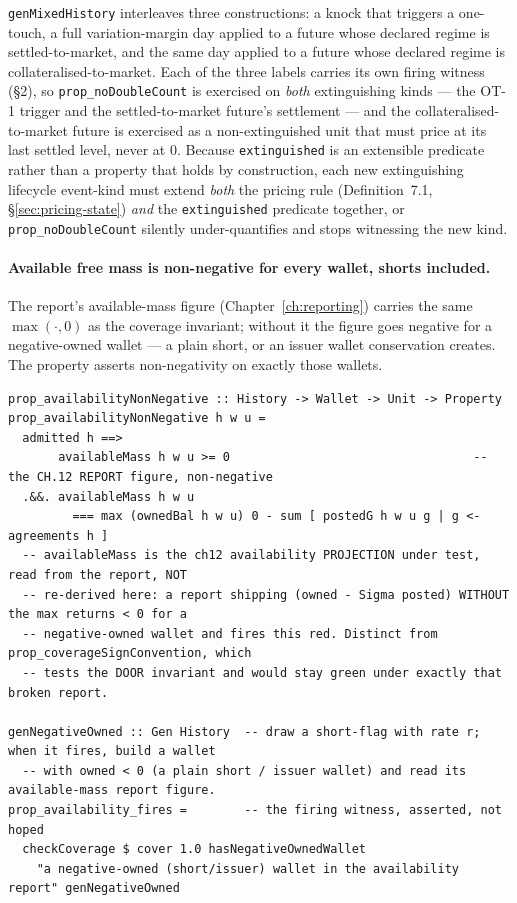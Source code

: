 \texttt{genMixedHistory} interleaves three constructions: a knock that triggers a one-touch, a
full variation-margin day applied to a future whose declared regime is settled-to-market, and
the same day applied to a future whose declared regime is collateralised-to-market. Each of the
three labels carries its own firing witness (\S 2), so
\texttt{prop\_noDoubleCount} is exercised on \emph{both} extinguishing kinds --- the OT-1 trigger
and the settled-to-market future's settlement --- and the collateralised-to-market future is
exercised as a non-extinguished unit that must price at its last settled level, never at $0$.
Because \texttt{extinguished} is an
extensible predicate rather than a property that holds by construction, each new extinguishing
lifecycle event-kind must extend \emph{both} the pricing rule (Definition~7.1,
\S\ref{sec:pricing-state}) \emph{and} the \texttt{extinguished} predicate together, or
\texttt{prop\_noDoubleCount} silently under-quantifies and stops witnessing the new kind.

\paragraph{Available free mass is non-negative for every wallet, shorts included.}
The report's available-mass figure (Chapter~\ref{ch:reporting}) carries the same
$\max(\cdot,0)$ as the coverage invariant; without it the figure goes negative for a
negative-owned wallet --- a plain short, or an issuer wallet conservation creates. The
property asserts non-negativity on exactly those wallets.

\begin{lstlisting}
prop_availabilityNonNegative :: History -> Wallet -> Unit -> Property
prop_availabilityNonNegative h w u =
  admitted h ==>
       availableMass h w u >= 0                                  -- the CH.12 REPORT figure, non-negative
  .&&. availableMass h w u
         === max (ownedBal h w u) 0 - sum [ postedG h w u g | g <- agreements h ]
  -- availableMass is the ch12 availability PROJECTION under test, read from the report, NOT
  -- re-derived here: a report shipping (owned - Sigma posted) WITHOUT the max returns < 0 for a
  -- negative-owned wallet and fires this red. Distinct from prop_coverageSignConvention, which
  -- tests the DOOR invariant and would stay green under exactly that broken report.

genNegativeOwned :: Gen History  -- draw a short-flag with rate r; when it fires, build a wallet
  -- with owned < 0 (a plain short / issuer wallet) and read its available-mass report figure.
prop_availability_fires =        -- the firing witness, asserted, not hoped
  checkCoverage $ cover 1.0 hasNegativeOwnedWallet
    "a negative-owned (short/issuer) wallet in the availability report" genNegativeOwned
\end{lstlisting}

